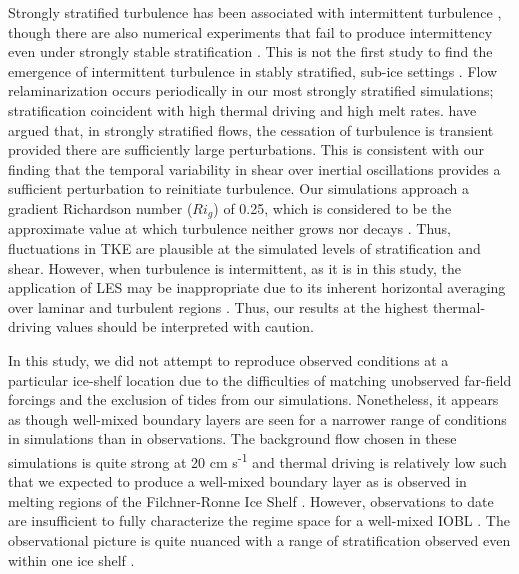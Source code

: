 \documentclass[draft]{agujournal2019}
\begin{document}
Strongly stratified turbulence has been associated with intermittent turbulence \cite{nieuwstadt_direct_2005, wiel_cessation_2012}, though there are also numerical experiments that fail to produce intermittency even under strongly stable stratification \cite{arya_buoyancy_1975, komori_turbulence_1983}. This is not the first study to find the emergence of intermittent turbulence in stably stratified, sub-ice settings \cite{vreugdenhil_stratification_2019}. Flow relaminarization occurs periodically in our most strongly stratified simulations; stratification coincident with high thermal driving and high melt rates.  have argued that, in strongly stratified flows, the cessation of turbulence is transient provided there are sufficiently large perturbations. This is consistent with our finding that the temporal variability in shear over inertial oscillations provides a sufficient perturbation to reinitiate turbulence. Our simulations approach a gradient Richardson number ($Ri_g$) of 0.25, which is considered to be the approximate value at which turbulence neither grows nor decays \cite{rohr_growth_1988, holt_numerical_1992}. Thus, fluctuations in TKE are plausible at the simulated levels of stratification and shear. However, when turbulence is intermittent, as it is in this study, the application of LES may be inappropriate due to its inherent horizontal averaging over laminar and turbulent regions \cite{stoll_large-eddy_2008}. Thus, our results at the highest thermal-driving values should be interpreted with caution. 

In this study, we did not attempt to reproduce observed conditions at a particular ice-shelf location due to the difficulties of matching unobserved far-field forcings and the exclusion of tides from our simulations. Nonetheless, it appears as though well-mixed boundary layers are seen for a narrower range of conditions in simulations than in observations. The background flow chosen in these simulations is quite strong at 20 cm s\textsuperscript{-1} and thermal driving is relatively low such that we expected to produce a well-mixed boundary layer as is observed in melting regions of the Filchner-Ronne Ice Shelf \cite{nicholls_oceanographic_2001}. However, observations to date are insufficient to fully characterize the regime space for a well-mixed IOBL \cite{malyarenko_synthesis_2020}. The observational picture is quite nuanced with a range of stratification observed even within one ice shelf \cite{hattermann_two_2012}. 


\end{document}
